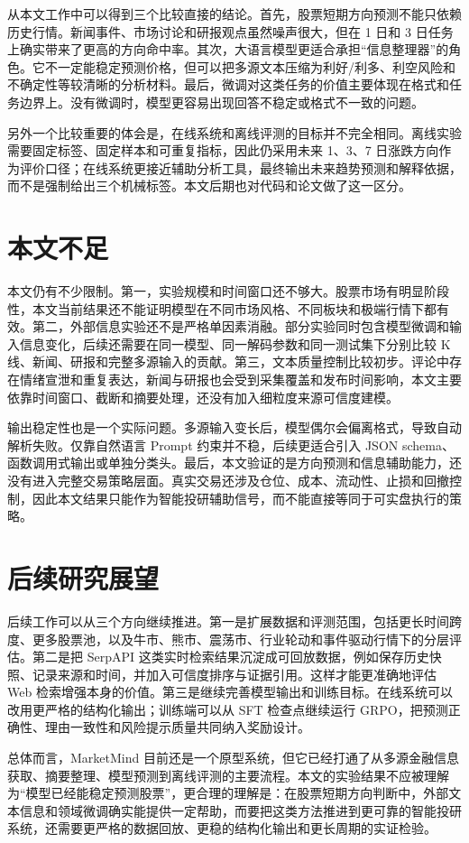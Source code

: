 从本文工作中可以得到三个比较直接的结论。首先，股票短期方向预测不能只依赖历史行情。新闻事件、市场讨论和研报观点虽然噪声很大，但在 1 日和 3 日任务上确实带来了更高的方向命中率。其次，大语言模型更适合承担“信息整理器”的角色。它不一定能稳定预测价格，但可以把多源文本压缩为利好/利多、利空风险和不确定性等较清晰的分析材料。最后，微调对这类任务的价值主要体现在格式和任务边界上。没有微调时，模型更容易出现回答不稳定或格式不一致的问题。

另外一个比较重要的体会是，在线系统和离线评测的目标并不完全相同。离线实验需要固定标签、固定样本和可重复指标，因此仍采用未来 1、3、7 日涨跌方向作为评价口径；在线系统更接近辅助分析工具，最终输出未来趋势预测和解释依据，而不是强制给出三个机械标签。本文后期也对代码和论文做了这一区分。

\section{本文不足}

本文仍有不少限制。第一，实验规模和时间窗口还不够大。股票市场有明显阶段性，本文当前结果还不能证明模型在不同市场风格、不同板块和极端行情下都有效。第二，外部信息实验还不是严格单因素消融。部分实验同时包含模型微调和输入信息变化，后续还需要在同一模型、同一解码参数和同一测试集下分别比较 K 线、新闻、研报和完整多源输入的贡献。第三，文本质量控制比较初步。评论中存在情绪宣泄和重复表达，新闻与研报也会受到采集覆盖和发布时间影响，本文主要依靠时间窗口、截断和摘要处理，还没有加入细粒度来源可信度建模。

输出稳定性也是一个实际问题。多源输入变长后，模型偶尔会偏离格式，导致自动解析失败。仅靠自然语言 Prompt 约束并不稳，后续更适合引入 JSON schema、函数调用式输出或单独分类头。最后，本文验证的是方向预测和信息辅助能力，还没有进入完整交易策略层面。真实交易还涉及仓位、成本、流动性、止损和回撤控制，因此本文结果只能作为智能投研辅助信号，而不能直接等同于可实盘执行的策略。

\section{后续研究展望}

后续工作可以从三个方向继续推进。第一是扩展数据和评测范围，包括更长时间跨度、更多股票池，以及牛市、熊市、震荡市、行业轮动和事件驱动行情下的分层评估。第二是把 SerpAPI 这类实时检索结果沉淀成可回放数据，例如保存历史快照、记录来源和时间，并加入可信度排序与证据引用。这样才能更准确地评估 Web 检索增强本身的价值。第三是继续完善模型输出和训练目标。在线系统可以改用更严格的结构化输出；训练端可以从 SFT 检查点继续运行 GRPO，把预测正确性、理由一致性和风险提示质量共同纳入奖励设计。

总体而言，MarketMind 目前还是一个原型系统，但它已经打通了从多源金融信息获取、摘要整理、模型预测到离线评测的主要流程。本文的实验结果不应被理解为“模型已经能稳定预测股票”，更合理的理解是：在股票短期方向判断中，外部文本信息和领域微调确实能提供一定帮助，而要把这类方法推进到更可靠的智能投研系统，还需要更严格的数据回放、更稳的结构化输出和更长周期的实证检验。
